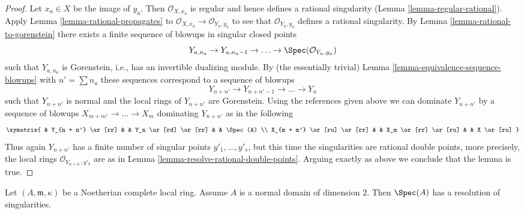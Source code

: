 \begin{proof}
\medskip\noindent
Let $x_a \in X$ be the image of $y_a$. Then $\mathcal{O}_{X, x_a}$
is regular and hence defines a rational singularity
(Lemma \ref{lemma-regular-rational}).
Apply Lemma \ref{lemma-rational-propagates} to
$\mathcal{O}_{X, x_a} \to \mathcal{O}_{Y_n, y_a}$
to see that $\mathcal{O}_{Y_n, y_a}$ defines a
rational singularity. By Lemma \ref{lemma-rational-to-gorenstein}
there exists a finite sequence of blowups in singular closed points
$$
Y_{a, n_a} \to Y_{a, n_a - 1} \to \ldots \to \Spec(\mathcal{O}_{Y_n, y_a})
$$
such that $Y_{a, n_a}$ is Gorenstein, i.e., has an
invertible dualizing module. By (the essentially trivial)
Lemma \ref{lemma-equivalence-sequence-blowups}
with $n' = \sum n_a$ these sequences correspond to a sequence of
blowups
$$
Y_{n + n'} \to Y_{n + n' - 1} \to \ldots \to Y_n
$$
such that $Y_{n + n'}$ is normal and
the local rings of $Y_{n + n'}$ are Gorenstein. Using the references
given above we can dominate $Y_{n + n'}$ by a sequence of blowups
$X_{m + m'} \to \ldots \to X_m$ dominating $Y_{n + n'}$ as in the following
$$
\xymatrix{
 & Y_{n + n'} \ar[rr] & & Y_n \ar[rd] \ar[rr] & & \Spec(A) \\
X_{m + m'} \ar[ru] \ar[rr] & & X_m \ar[rr] \ar[ru] & & X \ar[ru]
}
$$
Thus again $Y_{n + n'}$ has a finite number of singular points
$y'_1, \ldots, y'_s$, but this time the singularities are
rational double points, more precisely, the local rings
$\mathcal{O}_{Y_{n + n'}, y'_b}$ are as in
Lemma \ref{lemma-resolve-rational-double-points}.
Arguing exactly as above we conclude that the lemma is true.
\end{proof}

\begin{lemma}
\label{lemma-resolve-complete}
Let $(A, \mathfrak m, \kappa)$ be a Noetherian complete local ring.
Assume $A$ is a normal domain of dimension $2$. Then $\Spec(A)$ has a
resolution of singularities.
\end{lemma}

